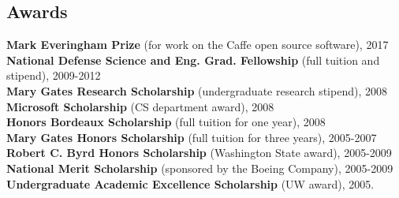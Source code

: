 \documentclass[line, margin]{res}
\begin{document}
\begin{resume}
\section{\sc Awards}
{\bf Mark Everingham Prize} (for work on the Caffe open source software), 2017\\
{\bf National Defense Science and Eng. Grad. Fellowship} (full tuition and stipend), 2009-2012\\
{\bf Mary Gates Research Scholarship} (undergraduate research stipend), 2008\\
{\bf Microsoft Scholarship} (CS department award), 2008\\
{\bf Honors Bordeaux Scholarship} (full tuition for one year), 2008\\
{\bf Mary Gates Honors Scholarship} (full tuition for three years), 2005-2007\\
{\bf Robert C. Byrd Honors Scholarship} (Washington State award), 2005-2009\\
{\bf National Merit Scholarship} (sponsored by the Boeing Company), 2005-2009\\
{\bf Undergraduate Academic Excellence Scholarship} (UW award), 2005.

\end{resume}
\end{document}
